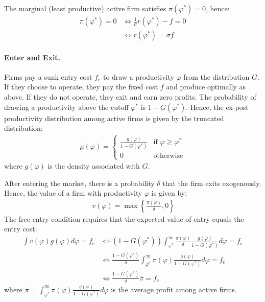 \begin{solution}
    The marginal (least productive) active firm satisfies $\pi(\varphi^*)=0$, hence:
    \begin{align*}
        \pi(\varphi^*) = 0 &\iff \frac{1}{\sigma} r(\varphi^*) - f = 0 \\
        &\iff r(\varphi^*) = \sigma f 
    \end{align*}

    \paragraph{Enter and Exit.} Firms pay a sunk entry cost $f_e$ to draw a productivity $\varphi$ from the distribution $G$. If they choose to operate, they pay the fixed cost $f$ and produce optimally as above. If they do not operate, they exit and earn zero profits. The probability of drawing a productivity above the cutoff $\varphi^*$ is $1 - G(\varphi^*)$. Hence, the ex-post productivity distribution among active firms is given by the truncated distribution:
    \begin{align*}
        \mu(\varphi) = \begin{cases}
            \frac{g(\varphi)}{1 - G(\varphi^*)} & \text{if } \varphi \geq \varphi^*\\
            0 & \text{otherwise}
        \end{cases}
    \end{align*}
    where $g(\varphi)$ is the density associated with $G$.

    After entering the market, there is a probability $\delta$ that the firm exits exogenously. Hence, the value of a firm with productivity $\varphi$ is given by:
    \begin{align*}\
        v(\varphi) = \max\left\{\frac{\pi(\varphi)}{\delta}, 0\right\}
    \end{align*}
    The free entry condition requires that the expected value of entry equals the entry cost:
    \begin{align*}
        \int v(\varphi) g(\varphi) d\varphi = f_e &\iff (1-G(\varphi^*))\int_{\varphi^*}^{\infty} \frac{\pi(\varphi)}{\delta} \frac{g(\varphi)}{1 - G(\varphi^*)} d\varphi = f_e \\
        &\iff \frac{1-G(\varphi^*)}{\delta} \int_{\varphi^*}^{\infty} \pi(\varphi) \frac{g(\varphi)}{1 - G(\varphi^*)} d\varphi = f_e \\
        &\iff \frac{1-G(\varphi^*)}{\delta} \bar{\pi} = f_e
    \end{align*}
    where $\bar{\pi} = \int_{\varphi^*}^{\infty} \pi(\varphi) \frac{g(\varphi)}{1 - G(\varphi^*)} d\varphi$ is the average profit among active firms.


\end{solution}
